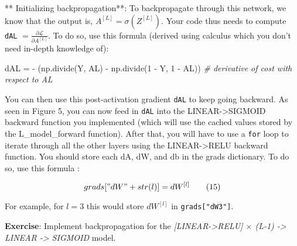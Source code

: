 \documentclass[11pt]{article}
\newenvironment{Shaded}{}{}
\newcommand{\DecValTok}[1]{\textcolor[rgb]{0.25,0.63,0.44}{{#1}}}
\newcommand{\CommentTok}[1]{\textcolor[rgb]{0.38,0.63,0.69}{\textit{{#1}}}}
\newcommand{\NormalTok}[1]{{#1}}
\newcommand{\OperatorTok}[1]{\textcolor[rgb]{0.40,0.40,0.40}{{#1}}}
\begin{document}
** Initializing backpropagation**: To backpropagate through this
network, we know that the output is, \(A^{[L]} = \sigma(Z^{[L]})\). Your
code thus needs to compute \texttt{dAL}
\(= \frac{\partial \mathcal{L}}{\partial A^{[L]}}\). To do so, use this
formula (derived using calculus which you don't need in-depth knowledge
of):

\begin{Shaded}
\begin{Highlighting}[]
\NormalTok{dAL }\OperatorTok{=} \OperatorTok{-}\NormalTok{ (np.divide(Y, AL) }\OperatorTok{-}\NormalTok{ np.divide(}\DecValTok{1} \OperatorTok{-}\NormalTok{ Y, }\DecValTok{1} \OperatorTok{-}\NormalTok{ AL)) }\CommentTok{# derivative of cost with respect to AL}
\end{Highlighting}
\end{Shaded}

You can then use this post-activation gradient \texttt{dAL} to keep
going backward. As seen in Figure 5, you can now feed in \texttt{dAL}
into the LINEAR-\textgreater{}SIGMOID backward function you implemented
(which will use the cached values stored by the L\_model\_forward
function). After that, you will have to use a \texttt{for} loop to
iterate through all the other layers using the LINEAR-\textgreater{}RELU
backward function. You should store each dA, dW, and db in the grads
dictionary. To do so, use this formula :

\[grads["dW" + str(l)] = dW^{[l]}\tag{15} \]

For example, for \(l=3\) this would store \(dW^{[l]}\) in
\texttt{grads{[}"dW3"{]}}.

\textbf{Exercise}: Implement backpropagation for the
\emph{{[}LINEAR-\textgreater{}RELU{]} \(\times\) (L-1) -\textgreater{}
LINEAR -\textgreater{} SIGMOID} model.
\end{document}
